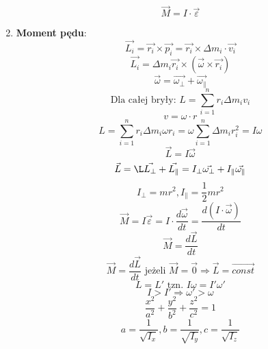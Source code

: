 \documentclass{article}
\begin{document}
\begin{enumerate}
\[		\]
		\[
		\vec{M} = I \cdot \vec{\varepsilon}
		\]
		\item \textbf{Moment pędu}:
		\[
		\vec{L_i} = \vec{r_i} \times \vec{p_i} = \vec{r_i} \times \Delta m_i \cdot \vec{v_i}
		\]
		\[
		\vec{L_i} = \Delta m_i \vec{r_i} \times (\vec{\omega} \times \vec{r_i})
		\]
		\[
		\vec{\omega} = \vec{\omega_{\perp}} + \vec{\omega_{\parallel}}
		\]
		\[
		\text{Dla całej bryły: }
		L = \sum\limits_{i = 1}^n r_i \Delta m_i v_i
		\]
		\[
		v = \omega \cdot r
		\]
		\[
		L = \sum\limits_{i = 1}^n r_i \Delta m_i \omega r_i = \omega \sum\limits_{i = 1}^n \Delta m_i r_i^2 = I \omega
		\]
		\[
		\vec{L} = I \vec{\omega}
		\]
		\[
		\vec{L} = \L\vec{L_{\perp}} + \vec{L_{\parallel}} = I_{\perp} \vec{\omega_{\perp}} + I_{\parallel} \vec{\omega_{\parallel}}
		\]
		\[
		I_{\perp} = mr^2, I_{\parallel} = \frac{1}{2} mr^2
		\]
		\[
		\vec{M} = I \vec{\varepsilon} = I \cdot \frac{d \vec{\omega}}{dt} = \frac{d(I \cdot \vec{\omega})}{dt}
		\]
		\[
		\vec{M} = \frac{d \vec{L}}{dt}
		\]
		\[
		\vec{M} = \frac{d \vec{L}}{dt} \text{ jeżeli } \vec{M} = \vec{0} \Rightarrow \vec{L} = \overrightarrow{const}
		\]
		\[
		L = L' \text{ tzn. } I \omega = I' \omega '
		\]
		\[
		I > I' \Rightarrow \omega ' > \omega
		\]
		\[
		\frac{x^2}{a^2} + \frac{y^2}{b^2} + \frac{z^2}{c^2} = 1
		\]
		\[
		a = \frac{1}{\sqrt{I_x}}, b = \frac{1}{\sqrt{I_y}}, c = \frac{1}{\sqrt{I_z}}
		\]
		
	\end{enumerate}
	
\end{document}
